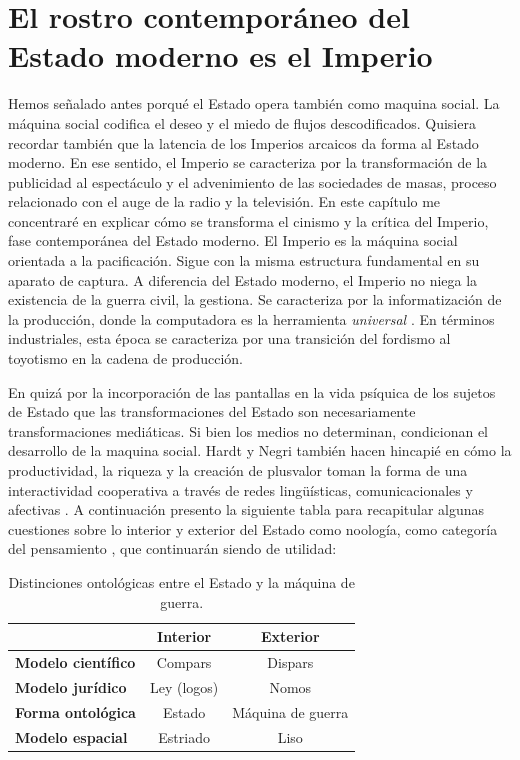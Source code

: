 \chapter{El rostro contemporáneo del Estado moderno es el Imperio}
\label{cha:el-rostro}

Hemos señalado antes porqué el Estado opera también como maquina social. La máquina social codifica el deseo y el miedo de flujos descodificados. Quisiera recordar también que la latencia de los Imperios arcaicos da forma al Estado moderno. En ese sentido, el Imperio se caracteriza por la transformación de la publicidad al espectáculo y el advenimiento de las sociedades de masas, proceso relacionado con el auge de la radio y la televisión. En este capítulo me concentraré en explicar cómo se transforma el cinismo y la crítica del Imperio, fase contemporánea del Estado moderno. El Imperio es la máquina social orientada a la pacificación. Sigue con la misma estructura fundamental en su aparato de captura. A diferencia del Estado moderno, el Imperio no niega la existencia de la guerra civil, la gestiona. Se caracteriza por la informatización de la producción, donde la computadora es la herramienta \emph{universal} \autocite{hardtImperio2005} . En términos industriales, esta época se caracteriza por una transición del fordismo al toyotismo en la cadena de producción.

En quizá por la incorporación de las pantallas en la vida psíquica de los sujetos de Estado que las transformaciones del Estado son necesariamente transformaciones mediáticas. Si bien los medios no determinan, condicionan el desarrollo de la maquina social. Hardt y Negri también hacen hincapié en cómo la productividad, la riqueza y la creación de plusvalor toman la forma de una interactividad cooperativa a través de redes lingüísticas, comunicacionales y afectivas \autocite[pp.~58,108]{hardtImperio2005}. A continuación presento la siguiente tabla para recapitular algunas cuestiones sobre lo interior y exterior del Estado como noología, como categoría del pensamiento \autocite{deleuzeMilMesetasCapitalismo2002}, que continuarán siendo de utilidad:

\begin{table}[htb]
  \caption{Distinciones ontológicas entre el Estado y la máquina de guerra.} %
  \label{tab:tablename}
  \centering
  \begin{tabular}{lcc}
    \toprule
    & \textbf{Interior} & \textbf{Exterior}\\
    \midrule
    \textbf{Modelo científico} & Compars & Dispars\\
    \textbf{Modelo jurídico} & Ley (logos) & Nomos\\
    \textbf{Forma ontológica} & Estado & Máquina de guerra\\
    \textbf{Modelo espacial} & Estriado & Liso\\
    \bottomrule
  \end{tabular}
\end{table}

